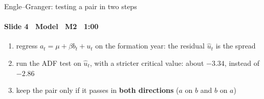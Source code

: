 \begin{frame}{Engle--Granger: testing a pair in two steps}
\framesubtitle{Slide 4 \textbullet\ Model \textbullet\ M2 \textbullet\ 1:00}
\vspace{-2pt}
\large\raggedright
\begin{enumerate}\setlength{\itemsep}{3pt}
  \item regress $a_t=\mu+\beta b_t+u_t$ on the formation year: the residual $\hat u_t$ is the spread
  \item run the ADF test on $\hat u_t$, with a stricter critical value: about $-3.34$, instead of $-2.86$
  \item keep the pair only if it passes in \textbf{both directions} ($a$ on $b$ and $b$ on $a$)
\end{enumerate}
\end{frame}
